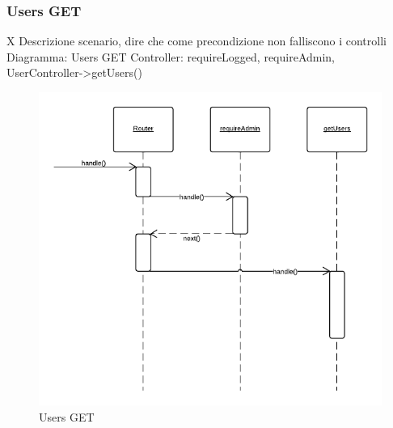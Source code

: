 \subsubsection{Users GET} X
Descrizione scenario, dire che come precondizione non falliscono i controlli
Diagramma: Users GET
Controller: requireLogged, requireAdmin, UserController->getUsers()
\begin{figure}[H]
	\begin{center} 
		\includegraphics[scale=0.60]{scenari/Users GET.png} 
		\caption{Users GET}
	\end{center} 
\end{figure}

